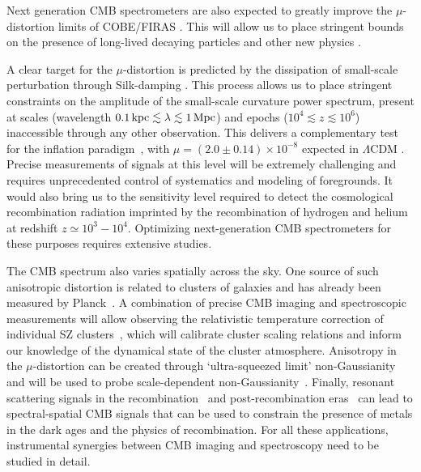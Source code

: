 Next generation CMB spectrometers are also expected to greatly improve the $\mu$-distortion 
limits of COBE/FIRAS \citep{Kogut2011PIXIE}. This will allow us to place stringent bounds on the presence of long-lived decaying 
particles \citep{Hu1993b, Chluba2013fore, Chluba2013PCA, Dimastrogiovanni2015} and other new 
physics \citep[e.g.,][]{Jedamzik2000, Tashiro2012, Dolgov2013, Tashiro2013, Caldwell2013, Yacine2015DM}.


A clear target for the $\mu$-distortion is predicted by the dissipation of small-scale perturbation through Silk-damping \citep{Sunyaev1970diss, Daly1991, Hu1994, Chluba2012}. 
This process allows us to place stringent constraints on the amplitude of the small-scale curvature power spectrum, present at 
scales (wavelength $0.1 \,{\rm kpc} \lesssim \lambda \lesssim 1\, {\rm Mpc}$) and epochs ($10^4 \lesssim z\lesssim 10^6$) 
inaccessible through any other observation. This delivers a complementary test for the inflation 
paradigm~\citep{Chluba2012inflaton, Dent2012, Chluba2013PCA, Clesse2014, Cabass2016}, with $\mu=(2.0\pm0.14)\times 10^{-8}$ 
expected in $\Lambda$CDM \citep{Chluba2016LCDM}. Precise measurements of signals at this level will be extremely challenging 
and requires unprecedented control of systematics and modeling of foregrounds. It would also bring us to the sensitivity level required 
to detect the cosmological recombination radiation \citep{Sunyaev2009, Chluba2016} imprinted by the recombination of hydrogen 
and helium at redshift $z\simeq 10^3-10^4$. Optimizing next-generation CMB spectrometers for these purposes requires extensive studies.

The CMB spectrum also varies spatially across the sky. One source of such anisotropic distortion is related to clusters of galaxies 
and has already been measured by Planck~\citep{Planck2013SZ}. A combination of precise CMB imaging and spectroscopic measurements 
will allow observing the relativistic temperature correction of individual SZ clusters~\citep{Sazonov1998, Itoh98, Challinor98}, which 
will calibrate cluster scaling relations and inform our knowledge of the dynamical state of the cluster atmosphere. 
Anisotropy in the $\mu$-distortion can 
be created through `ultra-squeezed limit' non-Gaussianity~\citep{Pajer2012, Ganc2012} and will be used to probe 
scale-dependent non-Gaussianity~\citep{Biagetti2013, Razi2015}. Finally, resonant scattering signals in the 
recombination~\citep{Jose2005, Carlos2007Pol, Lewis2013} and post-recombination 
eras~\citep{Kaustuv2004, Schleicher2008} can lead to spectral-spatial CMB signals that can be used to constrain the 
presence of metals in the dark ages and the physics of recombination. For all these applications, instrumental synergies between 
CMB imaging and spectroscopy need to be studied in detail. 

